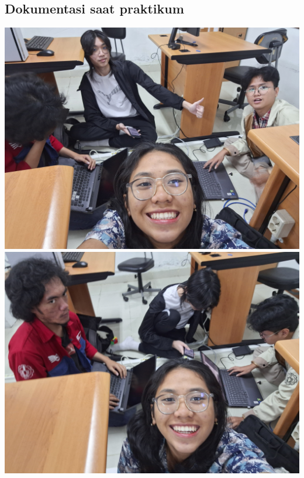 \subsection{Dokumentasi saat praktikum}
    \begin{center}
        \includegraphics[scale=0.1]{P1/img/komunal 1.jpg}
        \includegraphics[scale=0.1]{P1/img/komunal 2.jpg}        
    \end{center}